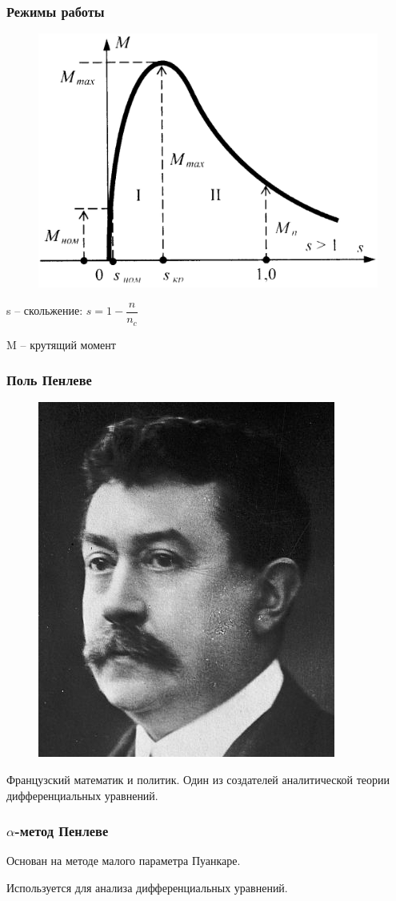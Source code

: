 \documentclass[14pt]{beamer}
\begin{document}
\begin{frame}
\frametitle{Режимы работы}

\begin{figure}[H]
  \center
  \includegraphics[width=0.6\linewidth]{zavisimost-1}
\end{figure}

\vspace{10pt}

\small{s -- скольжение: $ s = 1 - \dfrac{n}{n_c} $}	

\small{M -- крутящий момент}
	

\end{frame}




\begin{frame}
\frametitle{Поль Пенлеве}


\begin{figure}[H]
  \center
  \includegraphics[width=0.4\linewidth]{penleve}
\end{figure}

\small{Французский математик и политик. Один из создателей аналитической теории дифференциальных уравнений.
}
\end{frame}


\begin{frame}

\frametitle{$\alpha $-метод Пенлеве}

Основан на методе малого параметра Пуанкаре. 

Используется для анализа дифференциальных уравнений. 

\end{frame}
\end{document}
